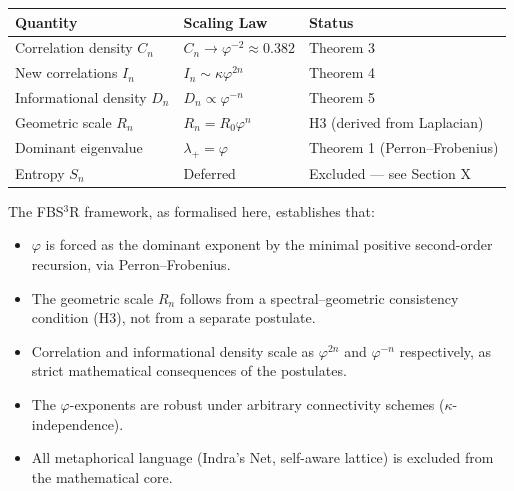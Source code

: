 \documentclass[12pt]{article}
\newcommand{\FBSR}{FBS$^3$R}
\newcommand{\ph}{\varphi}
\begin{document}
\begin{table}[h]
\centering
\renewcommand{\arraystretch}{1.25}
\begin{tabularx}{\textwidth}{>{\raggedright\arraybackslash}p{} >{\raggedright\arraybackslash}p{} X}
\toprule
\textbf{Quantity} & \textbf{Scaling Law} & \textbf{Status} \\
\midrule
Correlation density $C_n$ & $C_n\to\ph^{-2}\approx 0.382$ & Theorem 3 \\
New correlations $I_n$ & $I_n\sim\kappa\ph^{2n}$ & Theorem 4 \\
Informational density $D_n$ & $D_n\propto\ph^{-n}$ & Theorem 5 \\
Geometric scale $R_n$ & $R_n=R_0\ph^n$ & H3 (derived from Laplacian) \\
Dominant eigenvalue & $\lambda_+=\ph$ & Theorem 1 (Perron--Frobenius) \\
Entropy $S_n$ & Deferred & Excluded --- see Section X \\
\bottomrule
\end{tabularx}
\end{table}

The \FBSR{} framework, as formalised here, establishes that:
\begin{itemize}[leftmargin=2em]
    \item $\ph$ is forced as the dominant exponent by the minimal positive second-order recursion, via Perron--Frobenius.
    \item The geometric scale $R_n$ follows from a spectral--geometric consistency condition (H3), not from a separate postulate.
    \item Correlation and informational density scale as $\ph^{2n}$ and $\ph^{-n}$ respectively, as strict mathematical consequences of the postulates.
    \item The $\ph$-exponents are robust under arbitrary connectivity schemes ($\kappa$-independence).
    \item All metaphorical language (Indra's Net, self-aware lattice) is excluded from the mathematical core.
\end{itemize}
\end{document}
